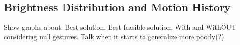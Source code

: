 \subsection{Brightness Distribution and Motion History}
Show graphs about:
Best solution,
Best feasible solution,
With and WithOUT considering null gestures.
Talk when it starts to generalize more poorly(?)
